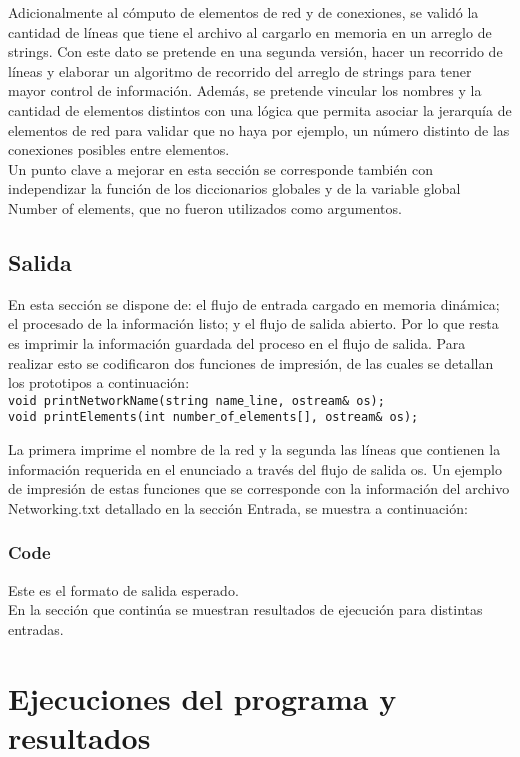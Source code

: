 \documentclass[10pt,a4paper]{report}
\begin{document}
Adicionalmente al cómputo de elementos de red y de conexiones, se validó la cantidad de líneas que tiene el archivo al cargarlo en memoria en un arreglo de strings. Con este dato se pretende en una segunda versión, hacer un recorrido de líneas y elaborar un algoritmo de recorrido del arreglo de strings para tener mayor control de información. Además, se pretende vincular los nombres y la cantidad de elementos distintos con una lógica que permita asociar la jerarquía de elementos de red para validar que no haya por ejemplo, un número distinto de las conexiones posibles entre elementos.\\
Un punto clave a mejorar en esta sección se corresponde también con independizar la función de los diccionarios globales y de la variable global Number of elements, que no fueron utilizados como argumentos.

\subsection{Salida}
En esta sección se dispone de: el flujo de entrada cargado en memoria dinámica; el procesado de la información listo; y el flujo de salida abierto. Por lo que resta es imprimir la información guardada del proceso en el flujo de salida. Para realizar esto se codificaron dos funciones de impresión, de las cuales se detallan los prototipos a continuación:\\

\texttt{void printNetworkName(string name$\_$line, ostream\& os);\\
void printElements(int number$\_$of$\_$elements[], ostream\& os);}

La primera imprime el nombre de la red y la segunda las líneas que contienen la información requerida en el enunciado a través del flujo de salida os. Un ejemplo de impresión de estas funciones que se corresponde con la información del archivo Networking.txt detallado en la sección Entrada, se muestra a continuación:

\subsubsection*{Code}


Este es el formato de salida esperado. \\
En la sección que continúa se muestran resultados de ejecución para distintas entradas.

\section{Ejecuciones del programa y resultados}
\end{document}

